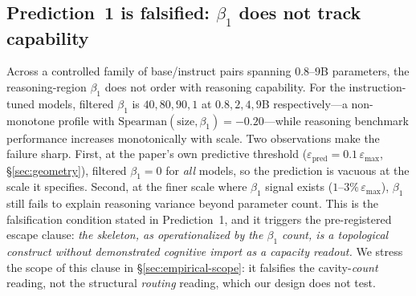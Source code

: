 \documentclass{article}
\begin{document}
\subsection{Prediction~1 is falsified: \texorpdfstring{\(\beta_1\)}{beta1} does not track capability}
\label{sec:empirical-p1}
Across a controlled family of base/instruct pairs spanning \(0.8\)--\(9\)B parameters, the
reasoning-region \(\beta_1\) does not order with reasoning capability. For the instruction-tuned
models, filtered \(\beta_1\) is \(40, 80, 90, 1\) at \(0.8, 2, 4, 9\)B respectively---a
non-monotone profile with \(\mathrm{Spearman}(\text{size}, \beta_1) = -0.20\)---while reasoning
benchmark performance increases monotonically with scale. Two observations make the failure
sharp. First, at the paper's own predictive threshold
(\(\varepsilon_{\text{pred}} = 0.1\,\varepsilon_{\max}\), \S\ref{sec:geometry}), filtered
\(\beta_1 = 0\) for \emph{all} models, so the prediction is vacuous at the scale it specifies.
Second, at the finer scale where \(\beta_1\) signal exists (\(1\)--\(3\%\,\varepsilon_{\max}\)),
\(\beta_1\) still fails to explain reasoning variance beyond parameter count. This is the
falsification condition stated in Prediction~1, and it triggers the pre-registered escape
clause: \emph{the skeleton, as operationalized by the \(\beta_1\) count, is a topological construct
without demonstrated cognitive import as a capacity readout.} We stress the scope of this clause
in \S\ref{sec:empirical-scope}: it falsifies the cavity-\emph{count} reading, not the structural
\emph{routing} reading, which our design does not test.
\end{document}
